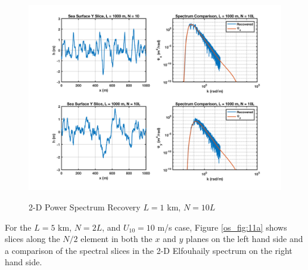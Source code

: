 \begin{figure}[ht]
  \begin{center}
\includegraphics[width=6in]{../media/Ocean_Surface/sea_surface_2d_slices_1000_10.png}
  \end{center}
  \renewcommand{\baselinestretch}{1} \small\normalsize
  \begin{quote}
    \caption[2-D Power Spectrum Recovery $L = 1$ km, $N = 10L$]{2-D Power Spectrum Recovery $L = 1$ km, $N = 10L$\label{os_fig:10a}}
  \end{quote}
\end{figure}
\renewcommand{\baselinestretch}{2} \small\normalsize

For the $L = 5$ km, $N = 2L$, and $U_{10} = 10$ m/s case, Figure \ref{os_fig:11a} shows slices along the $N/2$ element in both the $x$ and $y$ planes on the left hand side and a comparison of the spectral slices in the 2-D Elfouhaily spectrum on the right hand side.

